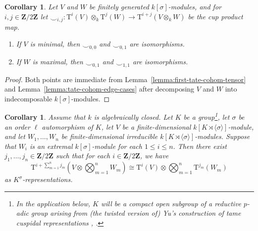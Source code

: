 \documentclass[reqno]{amsart}
\numberwithin{equation}{subsection}
\newcommand{\Z}{\mathbf{Z}}
\newcommand{\co}{\colon}
\newcommand{\rT}{\ensuremath{\mathrm{T}}\xspace}
\newtheorem{cor}[thm]{Corollary}
\theoremstyle{remark}
\newtheorem{remark}[thm]{Remark}
\numberwithin{equation}{subsection}
\numberwithin{figure}{subsection}
\begin{document}

\begin{cor}\label{cor:cup-product-extremal-cases}
Let $V$ and $W$ be finitely generated $k[\sigma]$-modules, and for $i, j \in \Z/2\Z$ let $\smile_{i,j}\co \rT^i(V) \otimes_k \rT^j(W) \to \rT^{i+j}(V \otimes_k W)$ be the cup product map.
\begin{enumerate}
    \item If $V$ is minimal, then $\smile_{0,0}$ and $\smile_{0,1}$ are isomorphisms.
    \item If $W$ is maximal, then $\smile_{0,1}$ and $\smile_{1,1}$ are isomorphisms.
\end{enumerate}
\end{cor}

\begin{proof}
Both points are immediate from Lemma~\ref{lemma:first-tate-cohom-tensor} and Lemma~\ref{lemma:tate-cohom-edge-cases} after decomposing $V$ and $W$ into indecomposable $k[\sigma]$-modules.
\end{proof}

\begin{cor}\label{cor:tate-cohom-tensor-product-yu}
Assume that $k$ is algebraically closed. Let $K$ be a group\footnote{In the application below, $K$ will be a compact open subgroup of a reductive $p$-adic group arising from (the twisted version of) Yu's construction of tame cuspidal representations \cite{Yu01}, \cite{FKS23}.}, let $\sigma$ be an order $\ell$ automorphism of $K$, let $V$ be a finite-dimensional $k[K \rtimes \langle\sigma\rangle]$-module, and let $W_1, \dots, W_n$ be finite-dimensional irreducible $k[K \rtimes \langle\sigma\rangle]$-modules. Suppose that $W_i$ is an extremal $k[\sigma]$-module for each $1 \leq i \leq n$. Then there exist $j_1, \dots, j_n \in \Z/2\Z$ such that for each $i \in \Z/2\Z$, we have
\[
\rT^{i + \sum_{m=1}^n j_m}\left(V \otimes \bigotimes_{m=1}^n W_m\right) \cong \rT^i(V) \otimes \bigotimes_{m=1}^n \rT^{j_m}(W_m)
\]
as $K^\sigma$-representations.
\end{cor}
\end{document}
